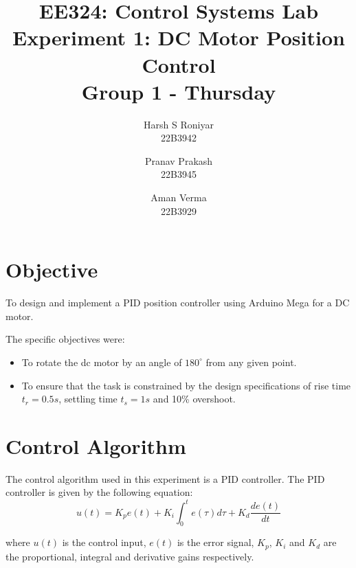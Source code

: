 \documentclass{article}
\title{EE324: Control Systems Lab \\ Experiment 1: DC Motor Position Control\\ \textbf{Group 1 - Thursday}}
\author{\large Harsh S Roniyar\\ \large 22B3942 \and \large Pranav Prakash\\ \large 22B3945 \and \large Aman Verma\\ \large 22B3929}
\begin{document}
\maketitle

\section{Objective}
To design and implement a PID position controller using Arduino Mega for a DC motor.

The specific objectives were:
\begin{itemize}
\item To rotate the dc motor by an angle of $180^{\circ}$ from any given point. 
\item To ensure that the task is constrained by the design specifications of rise time $t_r = 0.5s$, settling time $t_s = 1s$ and 10\% overshoot.
\end{itemize}

\section{Control Algorithm}

The control algorithm used in this experiment is a PID controller. The PID controller is given by the following equation:
\begin{equation}
u(t) = K_p e(t) + K_i \int_{0}^{t} e(\tau) d\tau + K_d \frac{de(t)}{dt}
\end{equation}

where $u(t)$ is the control input, $e(t)$ is the error signal, $K_p$, $K_i$ and $K_d$ are the proportional, integral and derivative gains respectively.

\clearpage
\end{document}
